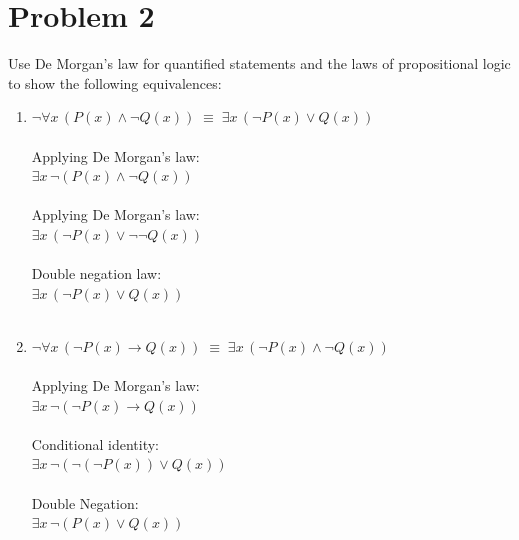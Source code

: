 \documentclass{amsart}
\theoremstyle{definition}
\theoremstyle{Exercise}
\theoremstyle{remark}
\theoremstyle{rule}
\numberwithin{equation}{section}
\begin{document}
\newpage


\section*{Problem 2}

Use De Morgan's law for quantified statements and the laws of propositional logic to show the following equivalences:\\
\begin{enumerate}[label=(\alph*)]
\item $\neg \forall x \, \left(P(x) \land \neg Q(x) \right)\; \equiv \; \exists x \, \left(\neg P(x) \lor  Q(x) \right)$\\\\

Applying De Morgan's law:\\
$\exists x\, \neg \left(P(x) \land \neg Q(x) \right)$\\\\

Applying De Morgan's law:\\
$\exists x\, \left( \neg P(x) \lor \neg \neg Q(x) \right)$\\\\

Double negation law:\\
$\exists x\, \left( \neg P(x) \lor Q(x) \right)$\\\\

\item $\neg \forall x \, \left(\neg P(x) \to Q(x) \right)\; \equiv \; \exists x \, \left(\neg P(x) \land  \neg Q(x) \right)$\\\\

Applying De Morgan's law:\\
$\exists x \, \neg \left(\neg P(x) \to Q(x) \right)$\\\\

Conditional identity:\\
$\exists x \, \neg \left(\neg (\neg P(x)) \lor Q(x) \right)$\\\\

Double Negation:\\
$\exists x \, \neg \left( P(x) \lor Q(x) \right)$\\\\


\end{enumerate}
\end{document}
